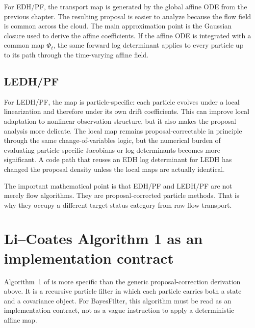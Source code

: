 For EDH/PF, the transport map is generated by the global affine ODE from the
previous chapter.  The resulting proposal is easier to analyze because the flow
field is common across the cloud.  The main approximation point is the Gaussian
closure used to derive the affine coefficients.  If the affine ODE is integrated
with a common map $\Phi_t$, the same forward log determinant applies to every
particle up to its path through the time-varying affine field.

\subsection{LEDH/PF}

For LEDH/PF, the map is particle-specific: each particle evolves under a local
linearization and therefore under its own drift coefficients.  This can improve
local adaptation to nonlinear observation structure, but it also makes the
proposal analysis more delicate.  The local map remains proposal-correctable in
principle through the same change-of-variables logic, but the numerical burden
of evaluating particle-specific Jacobians or log-determinants becomes more
significant.  A code path that reuses an EDH log determinant for LEDH has
changed the proposal density unless the local maps are actually identical.

The important mathematical point is that EDH/PF and LEDH/PF are not merely flow
algorithms.  They are proposal-corrected particle methods.  That is why they
occupy a different target-status category from raw flow transport.

\section{Li--Coates Algorithm 1 as an implementation contract}
\label{sec:bf-pfpf-li-coates-algorithm-contract}

Algorithm~1 of \citet{li2017particle} is more specific than the generic
proposal-correction derivation above.  It is a recursive particle filter in
which each particle carries both a state and a covariance object.  For
BayesFilter, this algorithm must be read as an implementation contract, not as
a vague instruction to apply a deterministic affine map.

